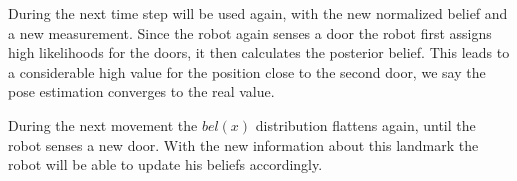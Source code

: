 \documentclass[Thesis.tex]{subfiles}
\begin{document}
During the next time step  will be used again, with the new normalized belief and a new measurement. Since the robot again senses a door the robot first assigns high likelihoods for the doors, it then calculates the posterior belief. This leads to a considerable high value for the position close to the second door, we say the pose estimation converges to the real value. 

During the next movement the $bel(x)$ distribution flattens again, until the robot senses a new door. With the new information about this landmark the robot will be able to update his beliefs accordingly.
\end{document}
